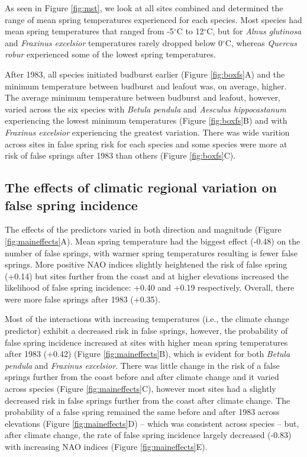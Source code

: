\documentclass{article}\usepackage[]{graphicx}\usepackage[]{color}
\begin{document}
As seen in Figure \ref{fig:mst}, we look at all sites combined and determined the range of mean spring temperatures experienced for each species.  Most species had mean spring temperatures that ranged from -5$^{\circ}$C to 12$^{\circ}$C, but for \textit{Alnus glutinosa} and \textit{Fraxinus excelsior} temperatures rarely dropped below 0$^{\circ}$C, whereas \textit{Quercus robur} experienced some of the lowest spring temperatures. 

After 1983, all species initiated budburst earlier (Figure \ref{fig:boxfs}A) and the minimum temperature between budburst and leafout was, on average, higher.  The average minimum temperature between budburst and leafout, however, varied across the six species with \textit{Betula pendula} and \textit{Aesculus hippocastanum} experiencing the lowest minimum temperatures (Figure \ref{fig:boxfs}B) and with \textit{Fraxinus excelsior} experiencing the greatest variation. There was wide varition across sites in false spring risk for each species and some species were more at risk of false springs after 1983 than others (Figure \ref{fig:boxfs}C).

\subsection*{The effects of climatic regional variation on false spring incidence}
The effects of the predictors varied in both direction and magnitude (Figure \ref{fig:maineffects}A). Mean spring temperature had the biggest effect (-0.48) on the number of false springs, with warmer spring temperatures resulting is fewer false springs. More positive NAO indices slightly heightened the risk of false spring (+0.14) but sites further from the coast and at higher elevations increased the likelihood of false spring incidence: +0.40 and +0.19 respectively. Overall, there were more false springs after 1983 (+0.35). 

Most of the interactions with increasing temperatures (i.e., the climate change predictor) exhibit a decreased risk in false springs, however, the probability of false spring incidence increased at sites with higher mean spring temperatures after 1983 (+0.42) (Figure \ref{fig:maineffects}B), which is evident for both \textit{Betula pendula} and \textit{Fraxinus excelsior}. There was little change in the risk of a false springs further from the coast before and after climate change and it varied across species (Figure \ref{fig:maineffects}C), however most sites had a slightly decreased risk in false springs further from the coast after climate change. The probability of a false spring remained the same before and after 1983 across elevations (Figure \ref{fig:maineffects}D) -- which was consistent across species -- but, after climate change, the rate of false spring incidence largely decreased (-0.83) with increasing NAO indices (Figure \ref{fig:maineffects}E). 
\end{document}
